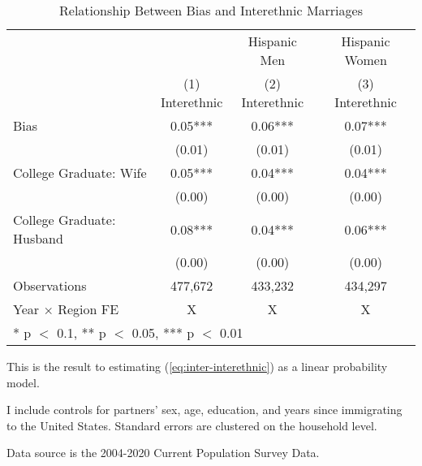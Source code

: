 \begin{table}[H]

\caption{Relationship Between Bias and Interethnic Marriages \label{regtab-logit-02}}
\centering
\begin{threeparttable}
\begin{tabular}[t]{lccc}
\toprule
\multicolumn{2}{c}{ } & \multicolumn{1}{c}{Hispanic Men} & \multicolumn{1}{c}{Hispanic Women} \\
\cmidrule(l{3pt}r{3pt}){3-3} \cmidrule(l{3pt}r{3pt}){4-4}
  & \specialcell{(1) \\ Interethnic} & \specialcell{(2) \\ Interethnic} & \specialcell{(3) \\ Interethnic}\\
\midrule
Bias & 0.05*** & 0.06*** & 0.07***\\
 & (0.01) & (0.01) & (0.01)\\
College Graduate: Wife & 0.05*** & 0.04*** & 0.04***\\
 & (0.00) & (0.00) & \vphantom{1} (0.00)\\
College Graduate: Husband & 0.08*** & 0.04*** & 0.06***\\
 & (0.00) & (0.00) & (0.00)\\
\midrule
Observations & 477,672 & 433,232 & 434,297\\
Year $\times$ Region FE & X & X & X\\
\bottomrule
\multicolumn{4}{l}{\rule{0pt}{1em}* p $<$ 0.1, ** p $<$ 0.05, *** p $<$ 0.01}\\
\end{tabular}
\begin{tablenotes}
\small
\item[1] \footnotesize{This is the result to estimating (\ref{eq:inter-interethnic}) as a
                      linear probability model.}
\item[2] \footnotesize{I include controls for partners' sex, age, education, 
                      and years since immigrating to the United States.
                      Standard errors are clustered on the household level.}
\item[3] \footnotesize{Data source is the 2004-2020 Current Population Survey Data.}
\end{tablenotes}
\end{threeparttable}
\end{table}
